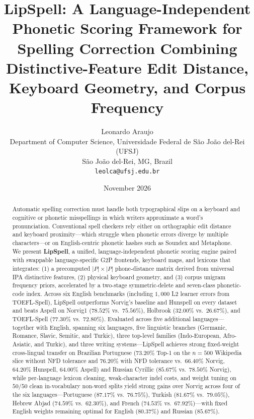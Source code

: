 \documentclass[11pt,a4paper]{article}
\title{LipSpell: A Language-Independent Phonetic Scoring Framework for Spelling Correction Combining Distinctive-Feature Edit Distance, Keyboard Geometry, and Corpus Frequency}
\author{
  Leonardo Araujo\\
  Department of Computer Science, Universidade Federal de S\~ao Jo\~ao del-Rei (UFSJ)\\
  S\~ao Jo\~ao del-Rei, MG, Brazil\\
  \texttt{leolca@ufsj.edu.br}
}
\date{November 2026}
\begin{document}
\maketitle

\begin{abstract}
Automatic spelling correction must handle both typographical slips on a keyboard and cognitive or phonetic misspellings in which writers approximate a word's pronunciation. Conventional spell checkers rely either on orthographic edit distance and keyboard proximity---which struggle when phonetic errors diverge by multiple characters---or on English-centric phonetic hashes such as Soundex and Metaphone. We present \textbf{LipSpell}, a unified, language-independent phonetic scoring engine paired with swappable language-specific G2P frontends, keyboard maps, and lexicons that integrates: (1) a precomputed $|P|\times|P|$ phone-distance matrix derived from universal IPA distinctive features, (2) physical keyboard geometry, and (3) corpus unigram frequency priors, accelerated by a two-stage symmetric-delete and seven-class phonetic-code index. Across six English benchmarks (including $1{,}000$ L2 learner errors from TOEFL-Spell), LipSpell outperforms Norvig's baseline and Hunspell on every dataset and beats Aspell on Norvig1 ($78.52\%$ vs.\ $75.56\%$), Holbrook ($32.00\%$ vs.\ $26.67\%$), and TOEFL-Spell ($77.30\%$ vs.\ $72.80\%$). Evaluated across five additional languages---together with English, spanning six languages, five linguistic branches (Germanic, Romance, Slavic, Semitic, and Turkic), three top-level families (Indo-European, Afro-Asiatic, and Turkic), and three writing systems---LipSpell achieves strong fixed-weight cross-lingual transfer on Brazilian Portuguese ($73.20\%$ Top-1 on the $n=500$ Wikipedia slice without NFD tolerance and $76.20\%$ with NFD tolerance vs.\ $66.40\%$ Norvig, $64.20\%$ Hunspell, $64.00\%$ Aspell) and Russian Cyrillic ($85.67\%$ vs.\ $78.50\%$ Norvig), while per-language lexicon cleaning, weak-character indel costs, and weight tuning on $50/50$ clean in-vocabulary non-word splits yield strong gains over Norvig across four of the six languages---Portuguese ($87.17\%$ vs.\ $76.75\%$), Turkish ($81.67\%$ vs.\ $79.05\%$), Hebrew Abjad ($74.59\%$ vs.\ $62.30\%$), and French ($74.53\%$ vs.\ $67.92\%$)---with fixed English weights remaining optimal for English ($80.37\%$) and Russian ($85.67\%$).
\end{abstract}
\end{document}
